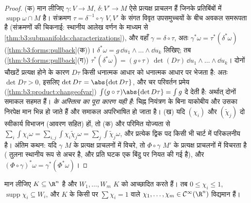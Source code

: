 \begin{proof}
(क) मान लीजिए $\gamma\colon V \to M$, $\delta\colon V' \to M$ ऐसे प्रत्यक्ष प्राचलन हैं जिनके
प्रतिबिंबों में $\operatorname{supp}\omega\cap M$ है। संक्रमण $\tau =
\delta^{-1}\circ\gamma$ $V, V'$ के संगत विवृत
उपसमुच्चयों के बीच अवकल समरूपता है (संक्रमणों की चिकनाई: स्थानीय
आलेख वर्णन के माध्यम से \cref{thm:b3:submanifolds:characterizations}), और वहाँ $\gamma = \delta\circ\tau$, अतः
$\gamma^*\omega = \tau^*(\delta^*\omega)$
(\cref{thm:b3:forms:pullback}(क))। $\delta^*\omega =
g\,\dd u_1\wedge\dots\wedge\dd u_k$ लिखिए; तब (\cref{thm:b3:forms:pullback}(ग)) $\tau^*(\delta^*\omega) =
(g\circ\tau)\,\det(D\tau)\,\dd u_1\wedge\dots\wedge\dd u_k$। दोनों चौखटें
प्रत्यक्ष होने के कारण $D\tau$ किसी धनात्मक आधार को धनात्मक आधार पर
भेजता है: अतः $\det D\tau > 0$, इसलिए $\det D\tau =
\abs{\det D\tau}$, और चर परिवर्तन प्रमेय (\cref{thm:b3:product:changeofvar})
$\int(g\circ\tau)\abs{\det D\tau} = \int g$ दे देती है: अर्थात् दोनों समाकल सहमत हैं। \emph{
के अस्तित्व का पूरा कारण यही है}: चिह्न नियंत्रण के बिना याकोबीय
और उसका निरपेक्ष मान भिन्न हो जाते हैं और समाकल अपरिभाषित हो जाता
है।
(ख) यदि $(\chi_i)$ और $(\tilde\chi_j)$ दो स्वीकार्य विभाजन (आवरण सहित) हों, तो
(क) और परिमित योज्यता से $\sum_i\int\chi_i\omega =
\sum_{i,j}\int\chi_i\tilde\chi_j\omega =
\sum_j\int\tilde\chi_j\omega$, और प्रत्येक द्विक पद किसी भी
चार्ट में परिकलनीय है। अंतिम कथन: यदि $\gamma$ $M$ के प्रत्यक्ष
प्राचलनों में विचरे, तो $\Phi\circ\gamma$ $M'$ के प्रत्यक्ष प्राचलनों में
विचरता है ( तुलना स्थानीय रूप से अचर है, और प्रति घटक एक
बिंदु पर नियत की गई है), और $(\Phi\circ\gamma)^*\omega =
\gamma^*(\Phi^*\omega)$।
\end{proof}

\begin{lemma}[इकाई विभाजन, संहत स्थिति]
\label{lem:b3:forms:partition}
मान लीजिए $K \subseteq \R^n$  है और  $W_1, \dots, W_m$ $K$ को आच्छादित
करते हैं। तब $0 \leq \chi_i \leq 1$,  $\operatorname{supp}\chi_i \subseteq W_i$, और $K$ के किसी  पर
$\sum\chi_i = 1$ वाले $\chi_1, \dots, \chi_m \in
\mathcal C^\infty(\R^n)$ विद्यमान हैं।
\end{lemma}

